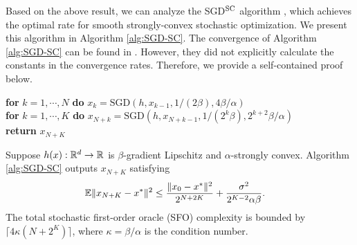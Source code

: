 {\begin{thm}{\citet[Theorem 4.1 (a)]{allen2018make}}
\end{thm} 


Based on the above result, we can analyze the SGD${}^{\rm SC}$ algorithm \citep[Algorithm 2]{allen2018make}, which achieves the optimal rate for smooth strongly-convex stochastic optimization. We present this algorithm in Algorithm \ref{alg:SGD-SC}. The convergence of Algorithm \ref{alg:SGD-SC} can be found in {\citep[Theorem 4.1 (b)]{allen2018make}}. However, they did not explicitly calculate the constants in the convergence rates. Therefore, we provide a self-contained proof below.

\begin{algorithm*}[htbp]  
\caption{SGD${}^{\rm SC}$ $(h, x_0, N, K)$} \label{alg:SGD-SC}
\begin{algorithmic}[1] 
\STATE \textbf{for} $k = 1,\cdots,N$ \quad \textbf{do} $x_{k} = \text{SGD}(h, x_{k-1}, 1/(2\beta), 4 \beta /\alpha) $ \\ [1mm]
\STATE \textbf{for} $k= 1,\cdots,K$ \quad \textbf{do} $x_{N+k} = \text{SGD}(h, x_{N+k-1},  1/ (2^k \beta), 2^{k+2} \beta /\alpha)$ \\ [1mm] 
\STATE \textbf{return} $x_{N+K}$   
\end{algorithmic}
\end{algorithm*}

\begin{thm} \label{thm:optimal-SGD-SC}
    Suppose $h(x): {\mathbb{R}}^d \rightarrow {\mathbb{R}}$ is $\beta$-gradient Lipschitz and $\alpha$-strongly convex. Algorithm \ref{alg:SGD-SC} outputs $x_{N+K}$ satisfying
    \begin{align}
        {\mathbb{E}} \Vert x_{N+K} - x^* \Vert^2 &\le \frac{\Vert x_0 - x^* \Vert^2}{2^{N+2K}} + \frac{\sigma^2}{2^{K-2} \alpha \beta}.
        \label{eq:EpochSGD-xK}
    \end{align}
The total stochastic first-order oracle (SFO) complexity is bounded by $ \lceil 4 \kappa ( N + 2^K) \rceil $, where $\kappa = \beta /\alpha$ is the condition number.
\end{thm}

}
